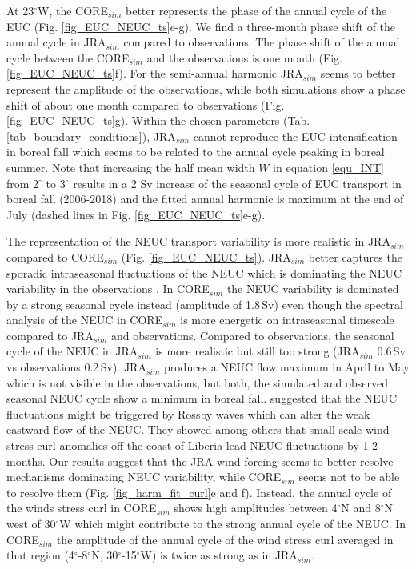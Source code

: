 \documentclass[os, manuscript]{copernicus}
\begin{document}
	At 23$^{\circ}$W, the CORE$_{sim}$ better represents the phase of the annual cycle of the EUC (Fig. \ref{fig_EUC_NEUC_ts}e-g). We find a three-month phase shift of the annual cycle in JRA$_{sim}$ compared to observations. The phase shift of the annual cycle between the CORE$_{sim}$ and the observations is one month (Fig. \ref{fig_EUC_NEUC_ts}f). For the semi-annual harmonic JRA$_{sim}$ seems to better represent the amplitude of the observations, while both simulations show a phase shift of about one month compared to observations (Fig. \ref{fig_EUC_NEUC_ts}g). Within the chosen parameters (Tab. \ref{tab_boundary_conditions}), JRA$_{sim}$ cannot reproduce the EUC intensification in boreal fall which seems to be related to the annual cycle peaking in boreal summer. Note that increasing the half mean width $ W $ in equation \ref{equ_INT} from 2$^{\circ}$ to 3$^{\circ}$ results in a 2 Sv increase of the seasonal cycle of EUC transport in boreal fall (2006-2018) and the fitted annual harmonic is maximum at the end of July (dashed lines in Fig. \ref{fig_EUC_NEUC_ts}e-g).
	
	The representation of the NEUC transport variability is more realistic in JRA$_{sim}$ compared to CORE$_{sim}$ (Fig. \ref{fig_EUC_NEUC_ts}). JRA$_{sim}$ better captures the sporadic intraseasonal fluctuations of the NEUC which is dominating the NEUC variability in the observations \citep{Burmeister2020}. In CORE$_{sim}$ the NEUC variability is dominated by a strong seasonal cycle instead (amplitude of 1.8$\,$Sv) even though the spectral analysis of the NEUC in CORE$_{sim}$ is more energetic on intraseasonal timescale compared to JRA$_{sim}$ and observations. Compared to observations, the seasonal cycle of the NEUC in JRA$_{sim}$ is more realistic but still too strong (JRA$_{sim}$ 0.6$\,$Sv vs observations 0.2$\,$Sv). JRA$_{sim}$ produces a NEUC flow maximum in April to May which is not visible in the observations, but both, the simulated and observed seasonal NEUC cycle show a minimum in boreal fall. \cite{Burmeister2020} suggested that the NEUC fluctuations might be triggered by Rossby waves which can alter the weak eastward flow of the NEUC. They showed among others that small scale wind stress curl anomalies off the coast of Liberia lead NEUC fluctuations by 1-2 months. Our results suggest that the JRA wind forcing seems to better resolve mechanisms dominating NEUC variability, while CORE$_{sim}$ seems not to be able to resolve them (Fig. \ref{fig_harm_fit_curl}e and f). Instead, the annual cycle of the winds stress curl in CORE$_{sim}$ shows high amplitudes between 4$^{\circ}$N and 8$^{\circ}$N west of 30$^{\circ}$W which might contribute to the strong annual cycle of the NEUC. In CORE$_{sim}$ the amplitude of the annual cycle of the wind stress curl averaged in that region (4$^{\circ}$-8$^{\circ}$N, 30$^{\circ}$-15$^{\circ}$W) is twice as strong as in JRA$_{sim}$.
	
\end{document}
